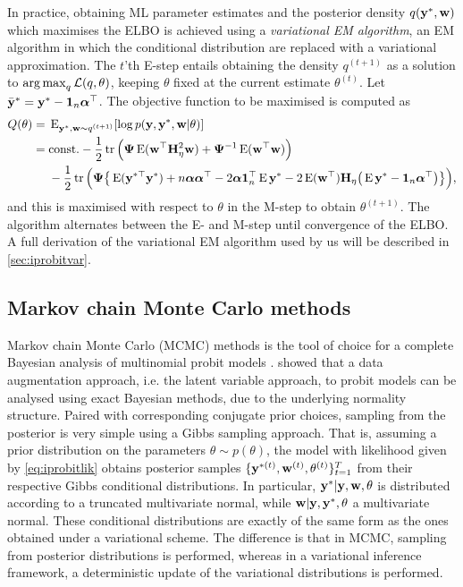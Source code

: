In practice, obtaining ML parameter estimates and the posterior density $q({\mathbf y}^*,{\mathbf w})$ which maximises the ELBO is achieved using a \emph{variational EM algorithm}, an EM algorithm in which the conditional distribution are replaced with a variational approximation.
The $t$'th E-step entails obtaining the density $q^{(t+1)}$ as a solution to $\operatorname*{arg\,max}_q {\mathcal L}(q,\theta)$, keeping $\theta$ fixed at the current estimate $\theta^{(t)}$.
Let $\bar{{\mathbf y}}^* = {\mathbf y}^* - {\mathbf 1}_n{\bm\alpha}^\top$.
The objective function to be maximised is computed as
\begin{align}
  Q(\theta) 
  ={}& \operatorname{E}_{{\mathbf y}^*,{\mathbf w}\sim q^{(t+1)}}  [ \log p({\mathbf y},{\mathbf y}^*,{\mathbf w}|\theta) ] \nonumber \\
  ={}& \text{const.}\hspace{0.01em} -\frac{1}{2}\operatorname{tr}\Big( {\bm\Psi} \operatorname{E}({\mathbf w}^\top{\mathbf H}_\eta^2{\mathbf w})  + {\bm\Psi}^{-1} \operatorname{E}({\mathbf w}^\top{\mathbf w}) \Big)  \nonumber \\
  &- \frac{1}{2} \operatorname{tr} \Big( 
  {\bm\Psi} \big\{
  \operatorname{E}({\mathbf y}^{*\top}{\mathbf y}^*)
  + n {\bm\alpha}{\bm\alpha}^\top 
  - 2{\bm\alpha} {\mathbf 1}_n^\top \operatorname{E} {\mathbf y}^*
  - 2\operatorname{E}({\mathbf w}^\top){\mathbf H}_\eta \big(\operatorname{E} {\mathbf y}^* - {\mathbf 1}_n{\bm\alpha}^\top \big) 
  \big\} \Big) \label{eq:iprobitQEstep}
  ,
\end{align}
and this is maximised with respect to $\theta$ in the M-step to obtain $\theta^{(t+1)}$.
The algorithm alternates between the E- and M-step until convergence of the ELBO.
A full derivation of the variational EM algorithm used by us will be described in \cref{sec:iprobitvar}.


\subsection{Markov chain Monte Carlo methods}

Markov chain Monte Carlo (MCMC) methods is the tool of choice for a complete Bayesian analysis of multinomial probit models \citep{mcculloch2000bayesian,nobile1998hybrid,mcculloch2000bayesian}.
\citet{albert1993bayesian} showed that a data augmentation approach, i.e. the latent variable approach, to probit models can be analysed using exact Bayesian methods, due to the underlying normality structure.
Paired with corresponding conjugate prior choices, sampling from the posterior is very simple using a Gibbs sampling approach.
That is, assuming a prior distribution on the parameters $\theta\sim p(\theta)$, the model with likelihood given by \cref{eq:iprobitlik} obtains posterior samples $\{{\mathbf y}^{*(t)}, {\mathbf w}^{(t)},\theta^{(t)} \}_{t=1}^T$ from their respective Gibbs conditional distributions.
In particular, ${\mathbf y}^{*}|{\mathbf y},{\mathbf w},\theta$ is distributed according to a truncated multivariate normal, while ${\mathbf w}|{\mathbf y},{\mathbf y}^*,\theta$ a multivariate normal.
These conditional distributions are exactly of the same form as the ones obtained under a variational scheme.
The difference is that in MCMC, sampling from posterior distributions is performed, whereas in a variational inference framework, a deterministic update of the variational distributions is performed.

